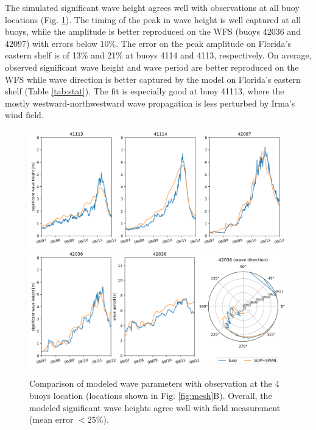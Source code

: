 The simulated significant wave height agrees well with observations at all buoy locations (Fig. \ref{fig:waves}). The timing of the peak in wave height is well captured at all buoys, while the amplitude is better reproduced on the WFS (buoys 42036 and 42097) with errors below 10\%. The error on the peak amplitude on Florida's eastern shelf is of 13\% and 21\% at buoys 4114 and 4113, respectively. On average, observed significant wave height and wave period are better reproduced on the WFS while wave direction is better captured by the model on Florida's eastern shelf (Table \ref{tab:stat}). The fit is especially good at buoy 41113, where the mostly westward-northwestward wave propagation is less perturbed by Irma's wind field.
\begin{figure}
    \centering
    \includegraphics[width=\textwidth]{chapters/irma/figures/hsig_validation.png}
    \includegraphics[width=\textwidth]{chapters/irma/figures/wave_validation_42036.png}
    \caption{Comparison of modeled wave parameters with observation at the 4 buoys location (locations shown in Fig. \ref{fig:mesh}B). Overall, the modeled significant wave heights agree well with field measurement (mean error $<25$\%). }
    \label{fig:waves}
\end{figure}

